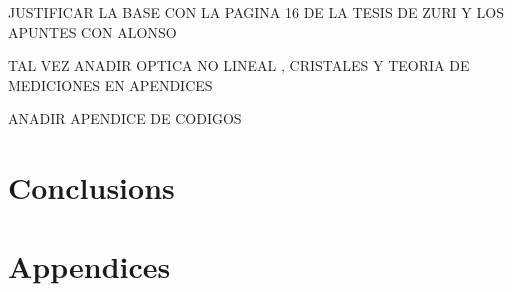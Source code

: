 \documentclass[12pt]{article}
\begin{document}
 JUSTIFICAR LA BASE CON LA PAGINA 16 DE LA TESIS DE ZURI Y LOS APUNTES CON ALONSO 

TAL VEZ ANADIR OPTICA NO LINEAL , CRISTALES Y TEORIA DE MEDICIONES EN APENDICES

ANADIR APENDICE DE CODIGOS





\pagebreak 
\section{Conclusions}
\pagebreak


\section{Appendices}
\pagebreak





\vspace{1 cm}
\end{document}
